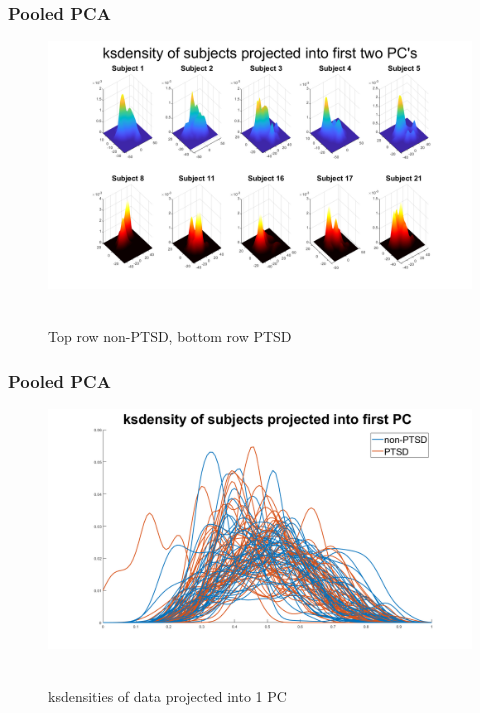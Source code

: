 \documentclass{beamer}
\begin{document}
\begin{frame}
\frametitle{Pooled PCA}

    \begin{figure}[h!]
  \centering

    \includegraphics[width=.8\textwidth]{ksdensitiesDim2.png}\\~\\
    \caption{Top row non-PTSD, bottom row PTSD}


  \label{fig:coffee1}
\end{figure}
\end{frame}


\begin{frame}
\frametitle{Pooled PCA}

    \begin{figure}[h!]
  \centering

    \includegraphics[width=.8\textwidth]{ksdensitiesDim1.png}\\~\\
    \caption{ksdensities of data projected into 1 PC}


  \label{fig:coffee1}
\end{figure}
\end{frame}
\end{document}

